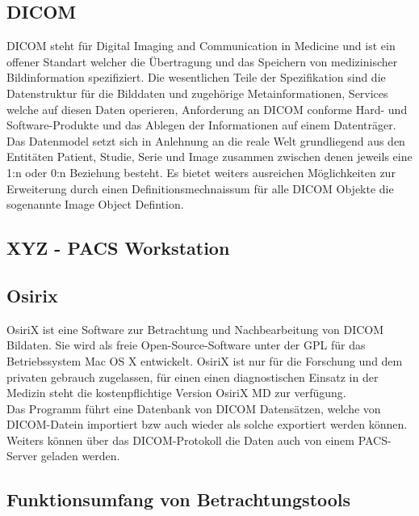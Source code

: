 \subsection{DICOM}
\label{sec:DICOM}
DICOM steht für Digital Imaging and Communication in Medicine und ist ein offener Standart welcher die Übertragung und das Speichern von medizinischer Bildinformation spezifiziert.
Die wesentlichen Teile der Spezifikation sind die Datenstruktur für die Bilddaten und zugehörige Metainformationen, 
Services welche auf diesen Daten operieren, Anforderung an DICOM conforme Hard- und Software-Produkte und das Ablegen der Informationen auf einem Datenträger.
Das Datenmodel setzt sich in Anlehnung an die reale Welt grundliegend aus den Entitäten Patient, Studie, Serie und Image zusammen zwischen denen jeweils eine 1:n oder 0:n Beziehung besteht.
Es bietet weiters ausreichen Möglichkeiten zur Erweiterung durch einen Definitionsmechnaissum für alle DICOM Objekte die sogenannte Image Object Defintion.

\subsection{XYZ - PACS Workstation}
\label{sec:XYZ - PACS Workstation}


\subsection{Osirix}
\label{sec:Osirix}
OsiriX ist eine Software zur Betrachtung und Nachbearbeitung von DICOM Bildaten.
Sie wird als freie Open-Source-Software unter der GPL für das Betriebssystem Mac OS X entwickelt.
OsiriX ist nur für die Forschung und dem privaten gebrauch zugelassen, 
für einen einen diagnostischen Einsatz in der Medizin steht die kostenpflichtige Version OsiriX MD zur verfügung.
\\
Das Programm führt eine Datenbank von DICOM Datensätzen, 
welche von DICOM-Datein importiert bzw auch wieder als solche exportiert werden können.
Weiters können über das DICOM-Protokoll die Daten auch von einem PACS-Server geladen werden.


\subsection{Funktionsumfang von Betrachtungstools}
\label{sec:Funktionsumfang von Betrachtungstools}

